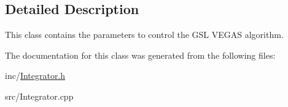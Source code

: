 \subsection{Detailed Description}
This class contains the parameters to control the G\-S\-L V\-E\-G\-A\-S algorithm. 

The documentation for this class was generated from the following files\-:\begin{DoxyCompactItemize}
\item 
inc/\hyperlink{Integrator_8h}{Integrator.\-h}\item 
src/Integrator.\-cpp\end{DoxyCompactItemize}

